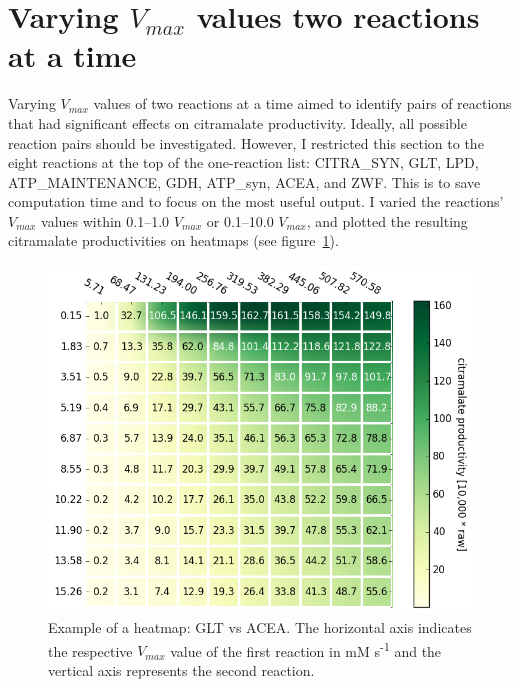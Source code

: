 \documentclass[parskip=full, numbers=noenddot]{scrreprt}
\begin{document}
\section{Varying $V_{max}$ values two reactions at a time}
\label{sec:couples}

Varying $V_{max}$ values of two reactions at a time aimed to identify pairs of reactions that had significant effects on citramalate productivity. Ideally, all possible reaction pairs should be investigated. However, I restricted this section to the eight reactions at the top of the one-reaction list: CITRA\_SYN, GLT, LPD, ATP\_MAINTENANCE, GDH, ATP\_syn, ACEA, and ZWF. This is to save computation time and to focus on the most useful output. I varied the reactions' $V_{max}$ values within 0.1--1.0 $V_{max}$ or 0.1--10.0 $V_{max}$, and plotted the resulting citramalate productivities on heatmaps (see figure~\ref{fig:heatmapsample}). %

\begin{figure}[h]
  \centering
  \includegraphics[scale=0.5]{heatmapsample}
  \caption{Example of a heatmap: GLT vs ACEA. The horizontal axis indicates the respective $V_{max}$ value of the first reaction in mM s\textsuperscript{-1} and the vertical axis represents the second reaction.}
  \label{fig:heatmapsample}
\end{figure}
\end{document}
